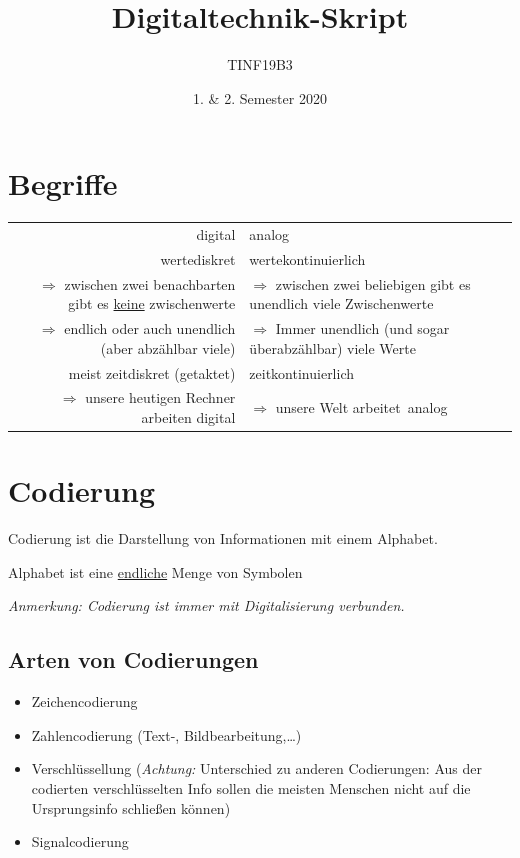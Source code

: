 \documentclass[10pt,a4paper]{scrartcl}
\author{TINF19B3}
\date{1. \& 2. Semester 2020}
\title{Digitaltechnik-Skript}
\begin{document}
	\maketitle
	\newpage
	\tableofcontents
	\newpage
	\section{Begriffe}
	\begin{tabular}{r|l}
		digital & analog \\
		wertediskret & wertekontinuierlich\\
		$\Rightarrow$ zwischen zwei benachbarten gibt es \underline{keine} zwischenwerte & $\Rightarrow$ zwischen zwei beliebigen gibt es unendlich viele Zwischenwerte \\
		$ \Rightarrow $ endlich oder auch unendlich (aber abzählbar viele) & $ \Rightarrow $ Immer unendlich (und sogar überabzählbar) viele Werte \\
		meist zeitdiskret (\glqq getaktet\grqq) & zeitkontinuierlich \\
		$ \Rightarrow $ unsere heutigen Rechner arbeiten digital & $ \Rightarrow $ unsere Welt \glqq arbeitet\grqq\ analog
	\end{tabular}

\section{Codierung}

	\begin{Theorem}{}{}
		Codierung ist die Darstellung von Informationen mit einem \glqq Alphabet\grqq.
	\end{Theorem}
		
	\begin{Theorem}{}{}
		Alphabet ist eine \underline{endliche} Menge von Symbolen
	\end{Theorem}
	
	\textit{Anmerkung: Codierung ist immer mit Digitalisierung verbunden.} \\
	
	\subsection{Arten von Codierungen}
	\begin{itemize}
		\item Zeichencodierung
		\item Zahlencodierung (Text-, Bildbearbeitung,\dots)
		\item Verschlüssellung (\textit{Achtung:} Unterschied zu anderen Codierungen: Aus der codierten verschlüsselten Info sollen die meisten Menschen nicht auf die Ursprungsinfo schließen können)
		\item Signalcodierung
	\end{itemize}
\end{document}
